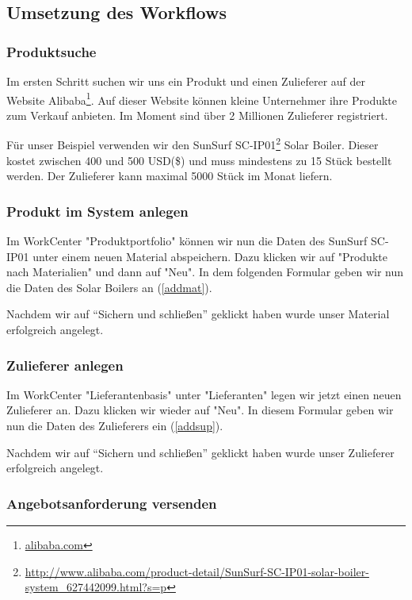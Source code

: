 \subsection{Umsetzung des Workflows}
\label{sec:byd-bsp-umsetzung}

\subsubsection{Produktsuche}

Im ersten Schritt suchen wir uns ein Produkt und einen Zulieferer auf der Website Alibaba\footnote{\url{alibaba.com}}. Auf dieser Website können kleine Unternehmer ihre Produkte zum Verkauf anbieten. Im Moment sind über 2 Millionen Zulieferer registriert.

Für unser Beispiel verwenden wir den SunSurf SC-IP01\footnote{\url{http://www.alibaba.com/product-detail/SunSurf-SC-IP01-solar-boiler-system_627442099.html?s=p}} Solar Boiler. Dieser kostet zwischen 400 und 500 USD(\$) und muss mindestens zu 15 Stück bestellt werden. Der Zulieferer kann maximal 5000 Stück im Monat liefern.

\subsubsection{Produkt im System anlegen}

Im WorkCenter "Produktportfolio" können wir nun die Daten des SunSurf SC-IP01 unter einem neuen Material abspeichern. Dazu klicken wir auf "Produkte nach Materialien" und dann auf "Neu". In dem folgenden Formular geben wir nun die Daten des Solar Boilers an (\ref{addmat}).

Nachdem wir auf "`Sichern und schließen"' geklickt haben wurde unser Material erfolgreich angelegt.

\subsubsection{Zulieferer anlegen}

Im WorkCenter "Lieferantenbasis" unter "Lieferanten" legen wir jetzt einen neuen Zulieferer an. Dazu klicken wir wieder auf "Neu". In diesem Formular geben wir nun die Daten des Zulieferers ein (\ref{addsup}).

Nachdem wir auf "`Sichern und schließen"' geklickt haben wurde unser Zulieferer erfolgreich angelegt.

\subsubsection{Angebotsanforderung versenden}

